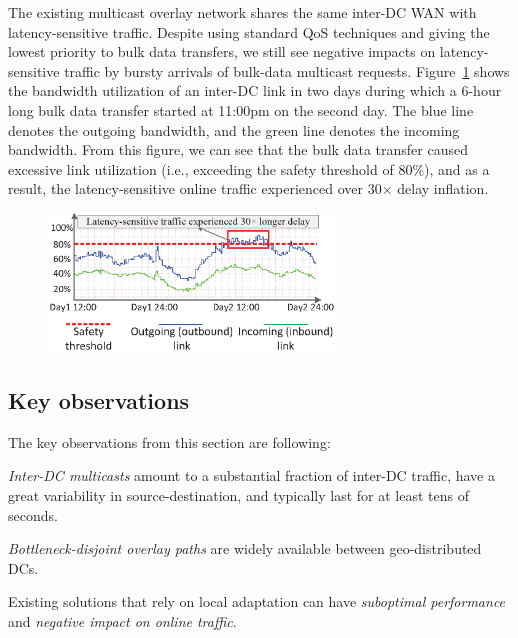 The existing multicast overlay network shares the same inter-DC WAN
with latency-sensitive traffic. Despite using standard QoS techniques 
and giving the lowest priority to bulk data transfers, we still see 
negative impacts on latency-sensitive traffic by bursty arrivals of 
bulk-data multicast requests. Figure~\ref{fig:lesson2} shows the 
bandwidth utilization of an inter-DC link in two days during which a 
6-hour long bulk data transfer started at 11:00pm on the second day. 
The blue line denotes the outgoing bandwidth, and the green line 
denotes the incoming bandwidth. From this figure, we can see that the
bulk data transfer caused excessive link utilization (i.e., exceeding
the safety threshold of 80\%), and as a result, the latency-sensitive 
online traffic experienced over 30$\times$ delay inflation.



\begin{figure}[t!]
        \center
        \includegraphics[width=3in]{images/nj02-M2A_0212-0216_v3.eps}
        \label{fig:lesson2}
\vspace{-0.1in}
\end{figure}

\subsection{Key observations}
The key observations from this section are following:
\begin{packeditemize}
\item {\em Inter-DC multicasts} amount to a substantial fraction of 
inter-DC traffic, have a great variability in source-destination, and 
typically last for at least tens of seconds.
\item {\em Bottleneck-disjoint overlay paths} are widely available
between geo-distributed DCs.
\item Existing solutions that rely on local adaptation can have 
{\em suboptimal performance} and {\em negative impact on
online traffic}.
\end{packeditemize}

